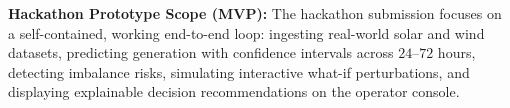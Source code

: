 \textbf{Hackathon Prototype Scope (MVP):} The hackathon submission focuses on a self-contained, working end-to-end loop: ingesting real-world solar and wind datasets, predicting generation with confidence intervals across $24$--$72$ hours, detecting imbalance risks, simulating interactive what-if perturbations, and displaying explainable decision recommendations on the operator console.
